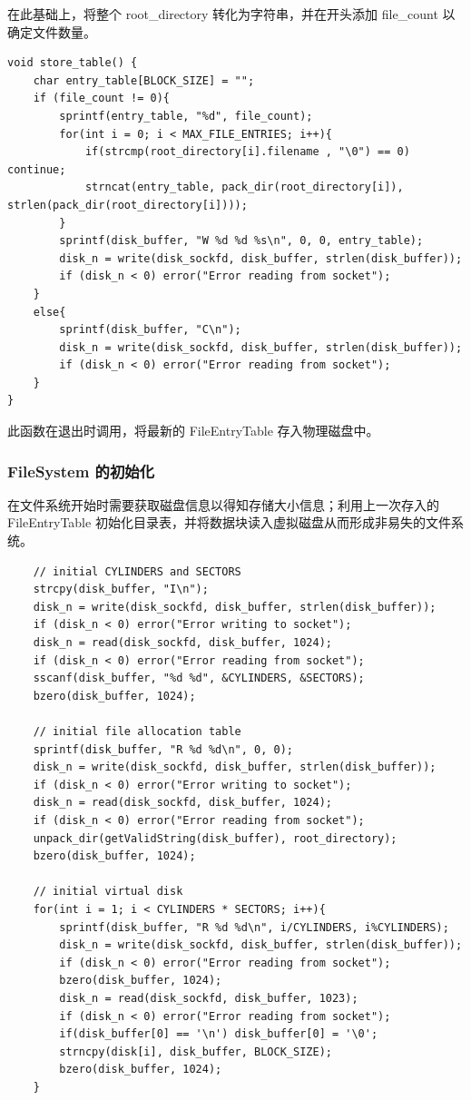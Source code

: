 \documentclass{article}
\begin{document}
在此基础上，将整个 root\_directory 转化为字符串，并在开头添加 file\_count 以确定文件数量。

\begin{lstlisting}
void store_table() {
    char entry_table[BLOCK_SIZE] = "";
    if (file_count != 0){
        sprintf(entry_table, "%d", file_count);
        for(int i = 0; i < MAX_FILE_ENTRIES; i++){
            if(strcmp(root_directory[i].filename , "\0") == 0) continue;
            strncat(entry_table, pack_dir(root_directory[i]), strlen(pack_dir(root_directory[i])));
        }
        sprintf(disk_buffer, "W %d %d %s\n", 0, 0, entry_table);
        disk_n = write(disk_sockfd, disk_buffer, strlen(disk_buffer));
        if (disk_n < 0) error("Error reading from socket");
    }
    else{
        sprintf(disk_buffer, "C\n");
        disk_n = write(disk_sockfd, disk_buffer, strlen(disk_buffer));
        if (disk_n < 0) error("Error reading from socket");
    }
}
\end{lstlisting}

此函数在退出时调用，将最新的 FileEntryTable 存入物理磁盘中。

\subsubsection{FileSystem 的初始化}

在文件系统开始时需要获取磁盘信息以得知存储大小信息；利用上一次存入的 FileEntryTable 初始化目录表，并将数据块读入虚拟磁盘从而形成非易失的文件系统。

\begin{lstlisting}
	// initial CYLINDERS and SECTORS
    strcpy(disk_buffer, "I\n");
    disk_n = write(disk_sockfd, disk_buffer, strlen(disk_buffer));
    if (disk_n < 0) error("Error writing to socket");
    disk_n = read(disk_sockfd, disk_buffer, 1024);
    if (disk_n < 0) error("Error reading from socket");
    sscanf(disk_buffer, "%d %d", &CYLINDERS, &SECTORS);
    bzero(disk_buffer, 1024);

    // initial file allocation table
    sprintf(disk_buffer, "R %d %d\n", 0, 0);
    disk_n = write(disk_sockfd, disk_buffer, strlen(disk_buffer));
    if (disk_n < 0) error("Error writing to socket");
    disk_n = read(disk_sockfd, disk_buffer, 1024);
    if (disk_n < 0) error("Error reading from socket");
    unpack_dir(getValidString(disk_buffer), root_directory);
    bzero(disk_buffer, 1024);

    // initial virtual disk
    for(int i = 1; i < CYLINDERS * SECTORS; i++){
        sprintf(disk_buffer, "R %d %d\n", i/CYLINDERS, i%CYLINDERS);
        disk_n = write(disk_sockfd, disk_buffer, strlen(disk_buffer));
        if (disk_n < 0) error("Error reading from socket");
        bzero(disk_buffer, 1024);
        disk_n = read(disk_sockfd, disk_buffer, 1023);
        if (disk_n < 0) error("Error reading from socket");
        if(disk_buffer[0] == '\n') disk_buffer[0] = '\0';
        strncpy(disk[i], disk_buffer, BLOCK_SIZE);
        bzero(disk_buffer, 1024);
    }
\end{lstlisting}
\end{document}
